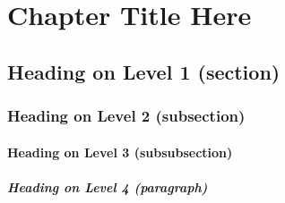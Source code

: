 
\chapter{Chapter Title Here}\label{chapterX}
 

\lipsum[1]


\section{Heading on Level 1 (section)}

\lipsum[2]


\subsection{Heading on Level 2 (subsection)}

\lipsum[3]


\subsubsection{Heading on Level 3 (subsubsection)}

\lipsum[4]


\paragraph{Heading on Level 4 (paragraph)}

\lipsum[5]


